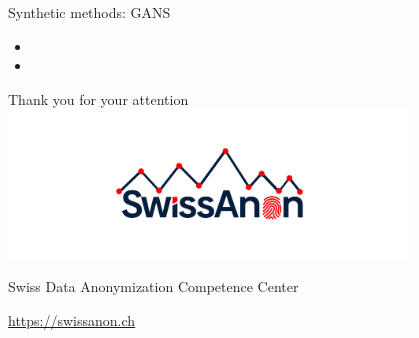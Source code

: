 \documentclass[
  ignorenonframetext,
  aspectratio=169,
]{beamer}
\begin{document}
\begin{frame}{Synthetic methods: GANS}
\label{synthetic-methods-gans}
\begin{itemize}
\item
  \color{red}{Generating synthetic data with GANs}
\item
  \Huge \color{red}{for Marco}
\end{itemize}
\end{frame}

\begin{frame}{}
\label{section}
\centering

\Huge Thank you for your attention\\

\includegraphics[width=0.8\textwidth,height=\textheight]{style/SwissAnon.png}

\large Swiss Data Anonymization Competence Center

\href{https://swissanon.ch}{\color{blue}\underline{https://swissanon.ch}}
\end{frame}
\end{document}
